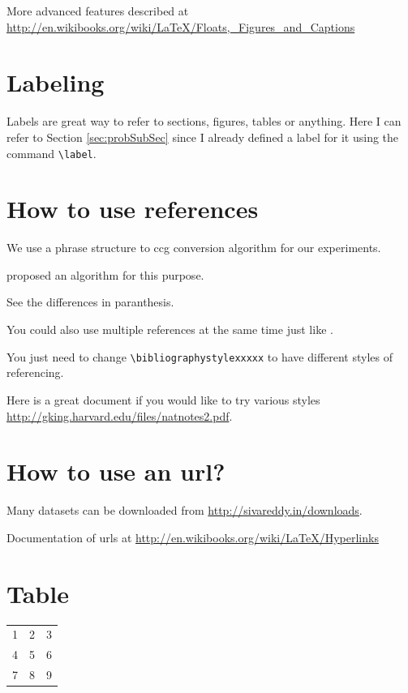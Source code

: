 \documentclass[bsc,logo]{infthesis}
\begin{document}
More advanced features described at
\url{http://en.wikibooks.org/wiki/LaTeX/Floats,_Figures_and_Captions}

\section{Labeling}
Labels are great way to refer to sections, figures, tables or anything. Here I can refer to Section \ref{sec:probSubSec} since I already defined a label for it using the command \texttt{\textbackslash label}.

\section{How to use references}

We use a phrase structure to ccg conversion algorithm \citep{Hockenmaier:2002} for our experiments.

\cite{Hockenmaier:2002} proposed an algorithm for this purpose. 

See the differences in paranthesis.

You could also use multiple references at the same time just like
\citep{Clark-et-al:2002,ClarkNCurran07}.

You just need to change \texttt{\textbackslash bibliographystyle{xxxxx}} to have
different styles of referencing.

Here is a great document if you would like to try various styles
\url{http://gking.harvard.edu/files/natnotes2.pdf}.

\section{How to use an url?}

Many datasets can be downloaded from \url{http://sivareddy.in/downloads}. 

Documentation of urls at \url{http://en.wikibooks.org/wiki/LaTeX/Hyperlinks}

\section{Table}

\begin{table}[h]
\centering
\begin{tabular}{ l | c || r }
\hline
  1 & 2 & 3 \\
  4 & 5 & 6 \\
\hline
  7 & 8 & 9 \\
\hline
\end{tabular}
\end{table}
\end{document}
